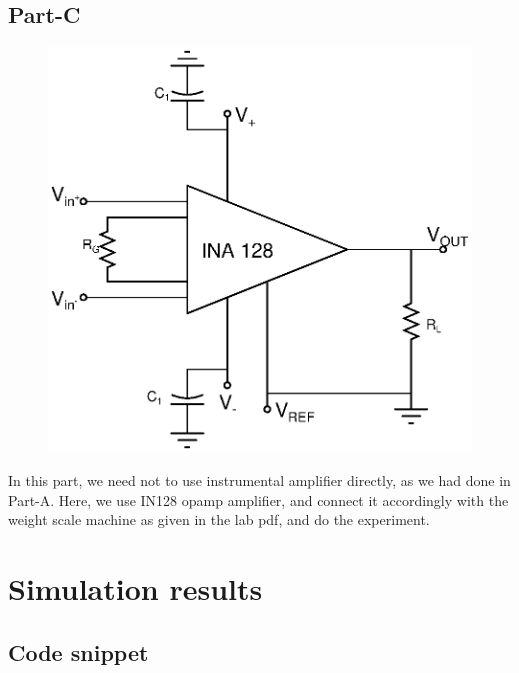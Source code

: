 \documentclass[12pt]{article}
\begin{document}
\subsection{Part-C}
\begin{figure}[H]
\begin{center}
\includegraphics[scale = 0.8]{Lab9-c.eps}
\end{center}
\end{figure}
In this part, we need not to use instrumental amplifier directly, as we had done in Part-A. Here, we use IN128 opamp amplifier, and connect it accordingly with the weight scale machine as given in the lab pdf, and do the experiment.

\section{Simulation results}%
\subsection{Code snippet}
\end{document}
